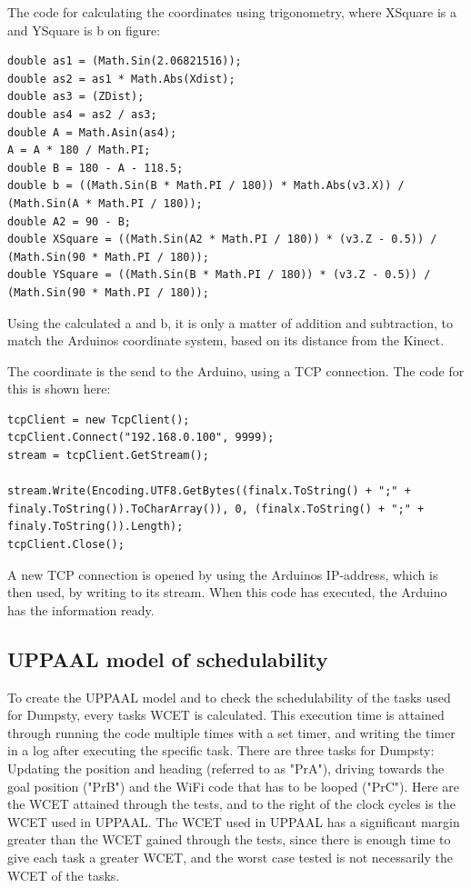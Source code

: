 The code for calculating the coordinates using trigonometry, where XSquare is a and YSquare is b on figure:

\begin{lstlisting}
double as1 = (Math.Sin(2.06821516));
double as2 = as1 * Math.Abs(Xdist);
double as3 = (ZDist);
double as4 = as2 / as3;
double A = Math.Asin(as4);
A = A * 180 / Math.PI;
double B = 180 - A - 118.5;
double b = ((Math.Sin(B * Math.PI / 180)) * Math.Abs(v3.X)) / (Math.Sin(A * Math.PI / 180));
double A2 = 90 - B;
double XSquare = ((Math.Sin(A2 * Math.PI / 180)) * (v3.Z - 0.5)) / (Math.Sin(90 * Math.PI / 180));
double YSquare = ((Math.Sin(B * Math.PI / 180)) * (v3.Z - 0.5)) / (Math.Sin(90 * Math.PI / 180));
\end{lstlisting}

Using the calculated a and b, it is only a matter of addition and subtraction, to match the Arduinos coordinate system, based on its distance from the Kinect.

The coordinate is the send to the Arduino, using a TCP connection.
The code for this is shown here:
\begin{lstlisting}
tcpClient = new TcpClient();
tcpClient.Connect("192.168.0.100", 9999);
stream = tcpClient.GetStream();

stream.Write(Encoding.UTF8.GetBytes((finalx.ToString() + ";" + finaly.ToString()).ToCharArray()), 0, (finalx.ToString() + ";" + finaly.ToString()).Length);
tcpClient.Close();
\end{lstlisting}

A new TCP connection is opened by using the Arduinos IP-address, which is then used, by writing to its stream.
When this code has executed, the Arduino has the information ready.

\subsection{UPPAAL model of schedulability}
\label{sec:i3UPPAAL model}
To create the UPPAAL model and to check the schedulability of the tasks used for Dumpsty, every tasks WCET is calculated. This execution time is attained through running the code multiple times with a set timer, and writing the timer in a log after executing the specific task. There are three tasks for Dumpsty: Updating the position and heading (referred to as "PrA"), driving towards the goal position ("PrB") and the WiFi code that has to be looped ("PrC"). Here are the WCET attained through the tests, and to the right of the clock cycles is the WCET used in UPPAAL. The WCET used in UPPAAL has a significant margin greater than the WCET gained through the tests, since there is enough time to give each task a greater WCET, and the worst case tested is not necessarily the WCET of the tasks. 

